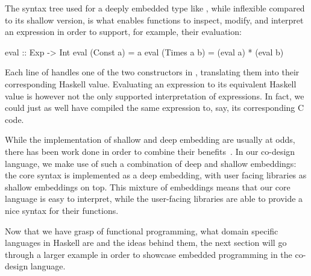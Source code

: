 \documentclass[../main.tex]{subfiles}
\begin{document}
The syntax tree used for a deeply embedded type like , while inflexible compared to its shallow version, is what enables functions to inspect, modify, and interpret an expression in order to support, for example, their evaluation:

\begin{code}
eval :: Exp -> Int
eval (Const a)   = a
eval (Times a b) = (eval a) * (eval b)
\end{code}

\noindent Each line of  handles one of the two constructors in , translating them into their corresponding Haskell value. Evaluating an expression to its equivalent Haskell value is however not the only supported interpretation of expressions. In fact, we could just as well have compiled the same expression to, say, its corresponding C code.



While the implementation of shallow and deep embedding are usually at odds, there has been work done in order to combine their benefits~\cite{svenningsson2012}. In our co-design language, we make use of such a combination of deep and shallow embeddings: the core syntax is implemented as a deep embedding, with user facing libraries as shallow embeddings on top. This mixture of embeddings means that our core language is easy to interpret, while the user-facing libraries are able to provide a nice syntax for their functions.


Now that we have grasp of functional programming, what domain specific languages in Haskell are and the ideas behind them, the next section will go through a larger example in order to showcase embedded programming in the co-design language.
\end{document}
